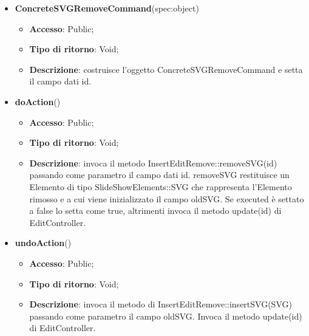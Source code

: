 {{{	
	\begin{itemize}
		\item \textbf{ConcreteSVGRemoveCommand}(spec:object)
		\begin{itemize}
			\item \textbf{Accesso}: Public;
			\item \textbf{Tipo di ritorno}: Void;
			\item \textbf{Descrizione}: costruisce l’oggetto ConcreteSVGRemoveCommand e setta il campo dati id.
		\end{itemize}
		\item \textbf{doAction}()
		\begin{itemize}
			\item \textbf{Accesso}: Public;
			\item \textbf{Tipo di ritorno}: Void;
			\item \textbf{Descrizione}: invoca il metodo InsertEditRemove::removeSVG(id) passando come parametro il campo dati id.	removeSVG restituisce un Elemento di tipo SlideShowElements::SVG che rappresenta l’Elemento rimosso e a cui viene inizializzato il campo oldSVG. Se executed è settato a false lo setta come true, altrimenti invoca il metodo update(id) di EditController.
		\end{itemize}
		\item \textbf{undoAction}()
		\begin{itemize}
			\item \textbf{Accesso}: Public;
			\item \textbf{Tipo di ritorno}: Void;
			\item \textbf{Descrizione}: invoca il metodo di InsertEditRemove::insertSVG(SVG) passando come parametro il campo oldSVG. Invoca il metodo update(id) di EditController.
		\end{itemize}
	\end{itemize}
	}

}}
